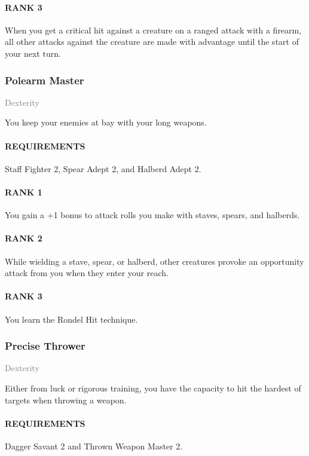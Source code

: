 \paragraph{RANK 3} When you get a critical hit against a creature on a ranged attack with a firearm, all other attacks against the creature are made with advantage until the start of your next turn.

\subsubsection{Polearm Master} \label{feat::polerarmmaster} %
\small{\textcolor{gray}{Dexterity}}

\normalsize
You keep your enemies at bay with your long weapons.
\paragraph{REQUIREMENTS} Staff Fighter 2, Spear Adept 2, and Halberd Adept 2.
\paragraph{RANK 1} You gain a +1 bonus to attack rolls you make with staves, spears, and halberds.
\paragraph{RANK 2} While wielding a stave, spear, or halberd, other creatures provoke an opportunity attack from you when they enter your reach.
\paragraph{RANK 3} You learn the Rondel Hit technique.

\subsubsection{Precise Thrower} \label{feat::precisethrower}
\small{\textcolor{gray}{Dexterity}}

\normalsize
Either from luck or rigorous training, you have the capacity to hit the hardest of targets when throwing a weapon.
\paragraph{REQUIREMENTS} Dagger Savant 2 and Thrown Weapon Master 2.

